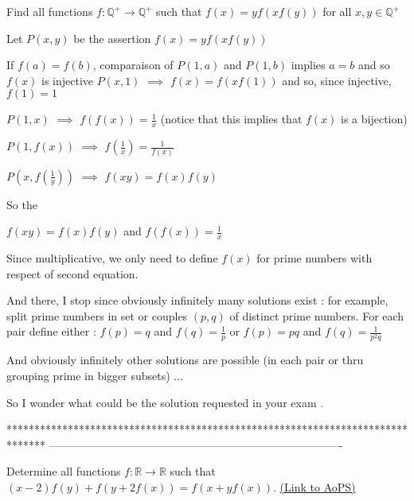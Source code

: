 \begin{solution}
	\begin{tcolorbox}Find all functions $f:\mathbb{Q}^+\to\mathbb{Q}^+$ such that $f(x)=yf(xf(y))$  for all $x,y\in\mathbb{Q}^+$\end{tcolorbox}
Let $P(x,y)$ be the assertion $f(x)=yf(xf(y))$

If $f(a)=f(b)$, comparaison of $P(1,a)$ and $P(1,b)$ implies $a=b$ and so $f(x)$ is injective
$P(x,1)$ $\implies$ $f(x)=f(xf(1))$ and so, since injective, $f(1)=1$

$P(1,x)$ $\implies$ $f(f(x))=\frac 1x$ (notice that this implies that $f(x)$ is a bijection)

$P(1,f(x))$ $\implies$ $f(\frac 1x)=\frac 1{f(x)}$

$P(x,f(\frac 1y))$ $\implies$ $f(xy)=f(x)f(y)$

So the  $f(xy)=f(x)f(y)$ and $f(f(x))=\frac 1x$

Since multiplicative, we only need to define $f(x)$ for prime numbers with respect of second equation.

And there, I  stop since obviously infinitely many solutions exist : for example, split prime numbers in set or couples $(p,q)$ of distinct prime numbers.
For each pair define either :
$f(p)=q$ and $f(q)=\frac 1p$
or $f(p)=pq$ and $f(q)=\frac 1{p^2q}$

And obviously infinitely other solutions are possible (in each pair or thru grouping prime in bigger subsets) ...

So I wonder what could be the solution requested in your exam .
\end{solution}
*******************************************************************************
-------------------------------------------------------------------------------

\begin{problem}
	Determine all functions $f: \mathbb{R}\to\mathbb{R}$ such that $(x-2)f(y)+f(y+2f(x))=f(x+yf(x))$.
	\flushright \href{https://artofproblemsolving.com/community/c6h557981}{(Link to AoPS)}
\end{problem}



